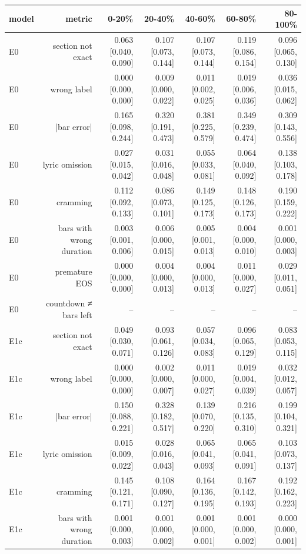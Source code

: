 \begin{table}[t]
\centering
\small
\begin{tabular}{lrrrrrr}
\toprule
model & metric & 0-20\% & 20-40\% & 40-60\% & 60-80\% & 80-100\% \\
\midrule
E0 & section not exact & 0.063 [0.040, 0.090] & 0.107 [0.073, 0.144] & 0.107 [0.073, 0.144] & 0.119 [0.086, 0.154] & 0.096 [0.065, 0.130] \\
E0 & wrong label & 0.000 [0.000, 0.000] & 0.009 [0.000, 0.022] & 0.011 [0.002, 0.025] & 0.019 [0.006, 0.036] & 0.036 [0.015, 0.062] \\
E0 & |bar error| & 0.165 [0.098, 0.244] & 0.320 [0.191, 0.473] & 0.381 [0.225, 0.579] & 0.349 [0.239, 0.474] & 0.309 [0.143, 0.556] \\
E0 & lyric omission & 0.027 [0.015, 0.042] & 0.031 [0.016, 0.048] & 0.055 [0.033, 0.081] & 0.064 [0.040, 0.092] & 0.138 [0.103, 0.178] \\
E0 & cramming & 0.112 [0.092, 0.133] & 0.086 [0.073, 0.101] & 0.149 [0.125, 0.173] & 0.148 [0.126, 0.173] & 0.190 [0.159, 0.222] \\
E0 & bars with wrong duration & 0.003 [0.001, 0.006] & 0.006 [0.000, 0.015] & 0.005 [0.001, 0.013] & 0.004 [0.000, 0.010] & 0.001 [0.000, 0.003] \\
E0 & premature EOS & 0.000 [0.000, 0.000] & 0.004 [0.000, 0.013] & 0.004 [0.000, 0.013] & 0.011 [0.000, 0.027] & 0.029 [0.011, 0.051] \\
E0 & countdown ≠ bars left & – & – & – & – & – \\
E1c & section not exact & 0.049 [0.030, 0.071] & 0.093 [0.061, 0.126] & 0.057 [0.034, 0.083] & 0.096 [0.065, 0.129] & 0.083 [0.053, 0.115] \\
E1c & wrong label & 0.000 [0.000, 0.000] & 0.002 [0.000, 0.007] & 0.011 [0.000, 0.027] & 0.019 [0.004, 0.039] & 0.032 [0.012, 0.057] \\
E1c & |bar error| & 0.150 [0.088, 0.221] & 0.328 [0.182, 0.517] & 0.139 [0.070, 0.220] & 0.216 [0.135, 0.310] & 0.199 [0.104, 0.321] \\
E1c & lyric omission & 0.015 [0.009, 0.022] & 0.028 [0.016, 0.043] & 0.065 [0.041, 0.093] & 0.065 [0.041, 0.091] & 0.103 [0.073, 0.137] \\
E1c & cramming & 0.145 [0.121, 0.171] & 0.108 [0.090, 0.127] & 0.164 [0.136, 0.195] & 0.167 [0.142, 0.193] & 0.192 [0.162, 0.223] \\
E1c & bars with wrong duration & 0.001 [0.000, 0.003] & 0.001 [0.000, 0.002] & 0.001 [0.000, 0.001] & 0.001 [0.000, 0.002] & 0.000 [0.000, 0.001] \\

\end{tabular}
\end{table}
